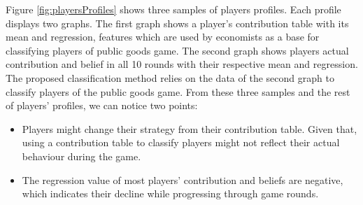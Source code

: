 Figure \ref{fig:playersProfiles} shows three samples of players profiles. Each profile displays two graphs. The first graph shows a player's contribution table with its mean and regression, features which are used by economists as a base for classifying players of public goods game. The second graph shows players actual contribution and belief in all 10 rounds with their respective mean and regression. The proposed classification method relies on the data of the second graph to classify players of the public goods game. From these three samples and the rest of players' profiles, we can notice two points:
\begin{itemize}
    \item Players might change their strategy from their contribution table. Given that, using a contribution table to classify players might not reflect their actual behaviour during the game.
    \item The regression value of most players' contribution and beliefs are negative, which indicates their decline while progressing through game rounds.
\end{itemize}

